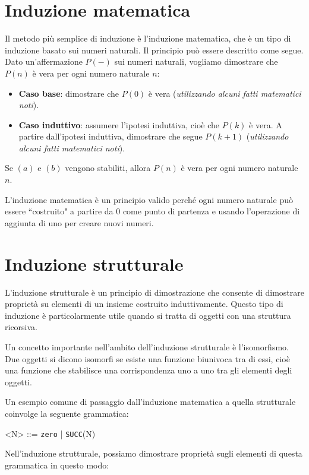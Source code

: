 \section{Induzione matematica}
Il metodo più semplice di induzione è l'induzione matematica, che è un tipo di induzione basato sui
numeri naturali. Il principio può essere descritto come segue. Dato un'affermazione $P(-)$ sui numeri naturali,
vogliamo dimostrare che $P(n)$ è vera per ogni numero naturale $n$:

\begin{itemize}
\item \textbf{Caso base}: dimostrare che $P(0)$ è vera (\textit{utilizzando alcuni
fatti matematici noti}).

\item \textbf{Caso induttivo}: assumere l'ipotesi induttiva, cioè che $P(k)$ è vera.
A partire dall'ipotesi induttiva, dimostrare che segue $P(k + 1)$ (\textit{utilizzando
alcuni fatti matematici noti}).
\end{itemize}
Se $(a)$ e $(b)$ vengono stabiliti, allora $P(n)$ è vera per ogni numero naturale $n$.

L'induzione matematica è un principio valido perché ogni numero naturale può essere ``costruito"
a partire da $0$ come punto di partenza e usando l'operazione di aggiunta di uno per creare nuovi numeri.
\section{Induzione strutturale}
L'induzione strutturale è un principio di dimostrazione che consente di dimostrare proprietà su elementi
di un insieme costruito induttivamente. Questo tipo di induzione è particolarmente utile quando si tratta
di oggetti con una struttura ricorsiva.

Un concetto importante nell'ambito dell'induzione strutturale è l'isomorfismo. Due oggetti si dicono
isomorfi se esiste una funzione biunivoca tra di essi, cioè una funzione che stabilisce una corrispondenza
uno a uno tra gli elementi degli oggetti.

Un esempio comune di passaggio dall'induzione matematica a quella strutturale coinvolge la seguente grammatica:

\begin{grammar}
  <N> ::= \texttt{zero} | \texttt{SUCC}(N)
\end{grammar}

Nell'induzione strutturale, possiamo dimostrare proprietà sugli elementi di questa grammatica in questo modo:

